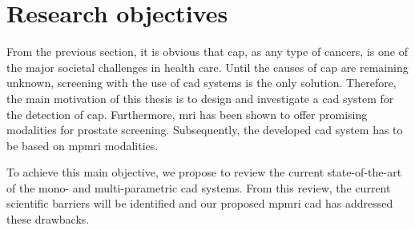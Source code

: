 \section{Research objectives}\label{sec:intro:motivation}


From the previous section, it is obvious that \ac{cap}, as any type of cancers, is one of the major societal challenges in health care.
Until the causes of \ac{cap} are remaining unknown, screening with the use of \ac{cad} systems is the only solution.
Therefore, the main motivation of this thesis is to design and investigate a \ac{cad} system for the detection of \ac{cap}.
Furthermore, \ac{mri} has been shown to offer promising modalities for prostate screening.
Subsequently, the developed \ac{cad} system has to be based on \ac{mpmri} modalities.

To achieve this main objective, we propose to review the current state-of-the-art of the mono- and multi-parametric \ac{cad} systems.
From this review, the current scientific barriers will be identified and our proposed \ac{mpmri} \ac{cad} has addressed these drawbacks.